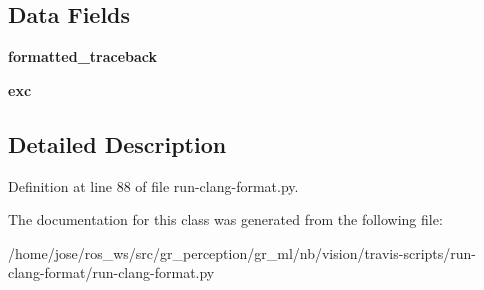 \subsection*{Data Fields}
\begin{DoxyCompactItemize}
\item 
\mbox{\label{classrun-clang-format_1_1UnexpectedError_aa6d53863304f610efc37548c17ba2466}} 
{\bfseries formatted\+\_\+traceback}
\item 
\mbox{\label{classrun-clang-format_1_1UnexpectedError_aadecc16b206c2c3b1e2bcef6b88be882}} 
{\bfseries exc}
\end{DoxyCompactItemize}


\subsection{Detailed Description}


Definition at line 88 of file run-\/clang-\/format.\+py.



The documentation for this class was generated from the following file\+:\begin{DoxyCompactItemize}
\item 
/home/jose/ros\+\_\+ws/src/gr\+\_\+perception/gr\+\_\+ml/nb/vision/travis-\/scripts/run-\/clang-\/format/run-\/clang-\/format.\+py\end{DoxyCompactItemize}
